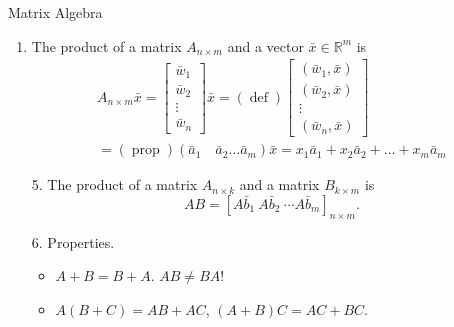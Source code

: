 \documentclass[11pt,aspectratio=169]{beamer}
\begin{document}
    \begin{frame}[t]{Matrix Algebra}
        \begin{enumerate}[4.]
            \item The product of a matrix $A_{n \times m}$ and a vector $\bar{x} \in \mathbb{R}^m$ is 
            \begin{equation*}
                \begin{gathered}
                    A_{n \times m} \bar{x}=\left[\begin{array}{c}
                    \bar{w}_{1} \\
                    \bar{w}_{2} \\
                    \vdots \\
                    \bar{w}_{n}
                    \end{array}\right] \bar{x}=(\operatorname{def})\left[\begin{array}{c}
                    \left(\bar{w}_{1}, \bar{x}\right) \\
                    \left(\bar{w}_{2}, \bar{x}\right) \\
                    \vdots \\
                    \left(\bar{w}_{n}, \bar{x}\right)
                    \end{array}\right] \\
                    =(\operatorname{prop})\left(\bar{a}_{1} \quad \bar{a}_{2} \ldots \bar{a}_{m}\right) \bar{x}=x_{1} \bar{a}_{1}+x_{2} \bar{a}_{2}+\ldots+x_{m} \bar{a}_{m}
                \end{gathered}
            \end{equation*} 

            \item[5.] The product of a matrix $A_{n \times k}$ and a matrix $B_{k \times m}$ is 
            \begin{equation*}  
                AB = \left[ A\bar{b}_1 \ A\bar{b}_2 \ \cdots A\bar{b}_m \right]_{n \times m}.
            \end{equation*}

            \item[6.] Properties.  
            \begin{itemize}
                \item $A+B = B+A$. $AB \neq BA$!
                \item $A(B+C) = AB + AC$, $(A+B)C = AC + BC$. 
            \end{itemize} 
        \end{enumerate}
    \end{frame}
\end{document}
